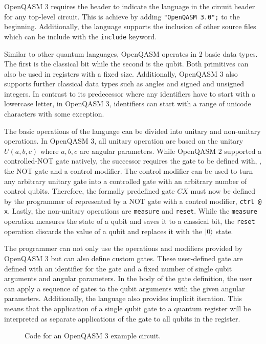 OpenQASM 3 requires the header to indicate the language in the circuit header for any top-level circuit. This is achieve by adding \texttt{"OpenQASM 3.0";} to the beginning. Additionally, the language supports the inclusion of other source files which can be include with the \texttt{include} keyword.

Similar to other quantum languages, OpenQASM operates in 2 basic data types. The first is the classical bit while the second is the qubit. Both primitives can also be used in registers with a fixed size. Additionally, OpenQASM 3 also supports further classical data types such as angles and signed and unsigned integers.
In contrast to its predecessor where any identifiers have to start with a lowercase letter, in OpenQASM 3, identifiers can start with a range of unicode characters with some exception. 

The basic operations of the language can be divided into unitary and non-unitary operations. In OpenQASM 3, all unitary operation are based on the unitary $U(a,b,c)$ where $a,b,c$ are angular parameters.
While OpenQASM 2 supported a controlled-NOT gate natively, the successor requires the gate to be defined with, \eg, the NOT gate and a control modifier. The control modifier can be used to turn any arbitrary unitary gate into a controlled gate with an arbitrary number of control qubits. Therefore, the formally predefined gate $CX$ must now be defined by the programmer of represented by a NOT gate with a control modifier, \eg \texttt{ctrl @ x}. Lastly, the non-unitary operations are \texttt{measure} and \texttt{reset}. While the \texttt{measure} operation measures the state of a qubit and saves it to a classical bit, the \texttt{reset} operation discards the value of a qubit and replaces it with the $\ket{0}$ state.

The programmer can not only use the operations and modifiers provided by OpenQASM 3 but can also define custom gates. These user-defined gate are defined with an identifier for the gate and a fixed number of single qubit arguments and angular parameters. In the body of the gate definition, the user can apply a sequence of gates to the qubit arguments with the given angular parameters. Additionally, the language also provides implicit iteration. This means that the application of a single qubit gate to a quantum register will be interpreted as separate applications of the gate to all qubits in the register.

\begin{figure}[htp]
    \centering     
    
    \caption{Code for an OpenQASM 3 example circuit.}
    \label{fig:qasm_example}
\end{figure}

